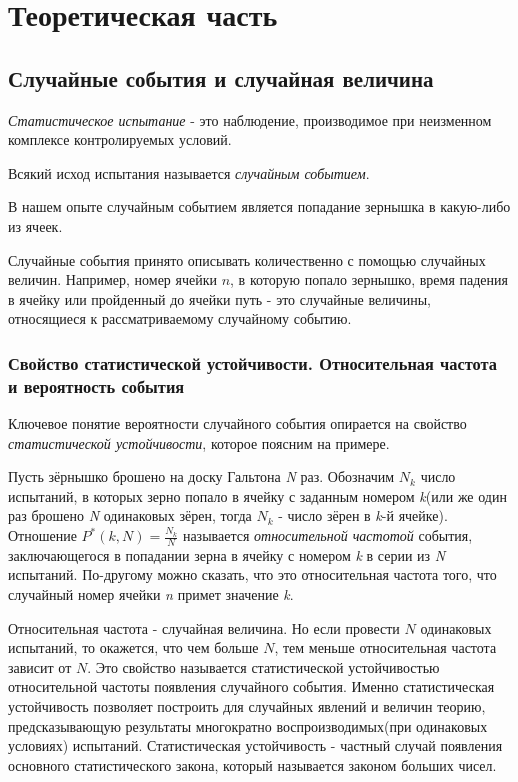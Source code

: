 \section{Теоретическая часть}
\subsection{Случайные события и случайная величина}

{\it Статистическое испытание} - это наблюдение, производимое при неизменном комплексе контролируемых условий.

Всякий исход испытания называется {\it случайным событием}. 

В нашем опыте случайным событием является попадание зернышка в какую-либо из ячеек.

Случайные события принято описывать количественно с помощью случайных величин. Например, номер ячейки $n$, в которую попало зернышко, время падения в ячейку или пройденный до ячейки путь - это случайные величины, относящиеся к рассматриваемому случайному событию.

\subsubsection{Свойство статистической устойчивости. Относительная частота и вероятность события}

Ключевое понятие вероятности случайного события опирается на свойство \textit{статистической устойчивости}, которое поясним на примере.

Пусть зёрнышко брошено на доску Гальтона \textit{N} раз. Обозначим $N_k$ число испытаний, в которых зерно попало в ячейку с заданным номером \textit{k}(или же один раз брошено \textit{N} одинаковых зёрен, тогда $N_k$ - число зёрен в \textit{k}-й ячейке). Отношение $P^*(k,N) = \frac{N_k}{N}$ называется \textit{относительной частотой} события, заключающегося в попадании зерна в ячейку с номером \textit{k} в серии из \textit{N} испытаний. По-другому можно сказать, что это относительная частота того, что случайный номер ячейки \textit{n} примет значение \textit{k}.

Относительная частота - случайная величина. Но если провести $N$ одинаковых испытаний, то окажется, что чем больше $N$, тем меньше относительная частота зависит от $N$. Это свойство называется статистической устойчивостью относительной частоты появления случайного события. Именно статистическая устойчивость позволяет построить для случайных явлений и величин теорию, предсказывающую результаты многократно воспроизводимых(при одинаковых условиях) испытаний. Статистическая устойчивость - частный случай появления основного статистического закона, который называется законом больших чисел.

